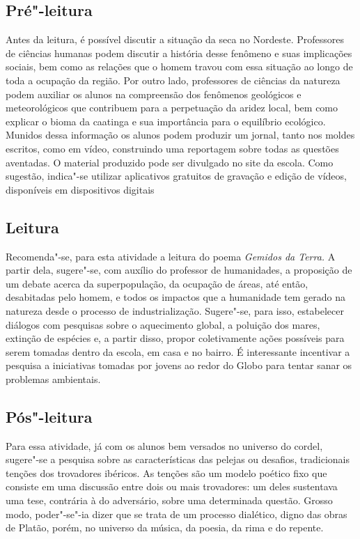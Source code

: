 \documentclass[12pt]{extarticle}
\begin{document}
{

\subsection{Pré"-leitura}

Antes da
leitura, é possível discutir a situação da seca no Nordeste. Professores
de ciências humanas podem discutir a história desse fenômeno e suas
implicações sociais, bem como as relações que o homem travou com essa
situação ao longo de toda a ocupação da região. Por outro lado,
professores de ciências da natureza podem auxiliar os alunos na
compreensão dos fenômenos geológicos e meteorológicos que contribuem
para a perpetuação da aridez local, bem como explicar o bioma da
caatinga e sua importância para o equilíbrio ecológico. Munidos dessa
informação os alunos podem produzir um jornal, tanto nos moldes
escritos, como em vídeo, construindo uma reportagem sobre todas as
questões aventadas. O material produzido pode ser divulgado no site da
escola. Como sugestão, indica"-se utilizar aplicativos gratuitos de
gravação e edição de vídeos, disponíveis em dispositivos digitais


\subsection{Leitura}

Recomenda"-se, para esta atividade a leitura do poema
\emph{Gemidos da Terra.} A partir dela, sugere"-se, com auxílio do
professor de humanidades, a proposição de um debate acerca da
superpopulação, da ocupação de áreas, até então, desabitadas pelo homem,
e todos os impactos que a humanidade tem gerado na natureza desde o
processo de industrialização. Sugere"-se, para isso, estabelecer diálogos
com pesquisas sobre o aquecimento global, a poluição dos mares, extinção
de espécies e, a partir disso, propor coletivamente ações possíveis para
serem tomadas dentro da escola, em casa e no bairro. É interessante
incentivar a pesquisa a iniciativas tomadas por jovens ao redor do Globo
para tentar sanar os problemas ambientais.

\subsection{Pós"-leitura}

Para essa atividade, já com os alunos bem versados no
universo do cordel, sugere"-se a pesquisa sobre as características das
pelejas ou desafios, tradicionais tenções dos trovadores ibéricos. As
tenções são um modelo poético fixo que consiste em uma discussão entre
dois ou mais trovadores: um deles sustentava uma tese, contrária à do
adversário, sobre uma determinada questão. Grosso modo, poder"-se"-ia
dizer que se trata de um processo dialético, digno das obras de Platão,
porém, no universo da música, da poesia, da rima e do repente.

}
\end{document}
